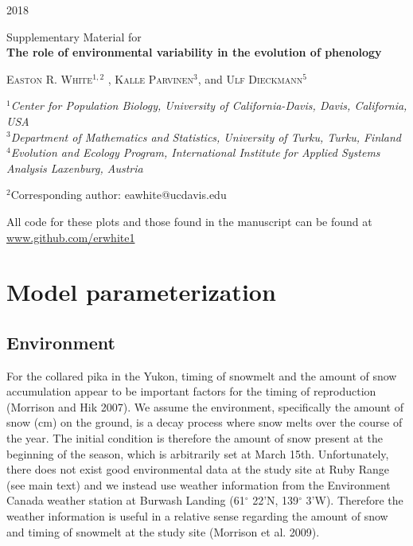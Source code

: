 \documentclass[12pt,]{article}
\title{}
\author{}
\date{}
\begin{document}
2018 \vspace{2cm}

\begin{center}
{\large Supplementary Material for \\ \textbf{The role of environmental variability in the evolution of phenology}} \\

\vspace{1cm}

\textsc{Easton R. White$^{1,2}$ , Kalle Parvinen$^{3}$}, and \textsc{Ulf Dieckmann$^5$} 
        \vspace{2mm}
        
\emph{\small $^1$Center for Population Biology, University of California-Davis, Davis, California, USA \\
            $^3$Department of Mathematics and Statistics, University of Turku, Turku, Finland \\ 
            $^4$Evolution and Ecology Program, International Institute for Applied Systems Analysis Laxenburg, Austria}
        \vspace{0.5mm}
        
$^2$Corresponding author: eawhite@ucdavis.edu
    \vspace{2 mm}
\tableofcontents

\vspace{1cm}
All code for these plots and those found in the manuscript can be found at \hyperref[]{www.github.com/erwhite1}


\end{center}

\pagebreak

\linenumbers

\section{Model parameterization}

\subsection{Environment}

For the collared pika in the Yukon, timing of snowmelt and the amount of
snow accumulation appear to be important factors for the timing of
reproduction (Morrison and Hik 2007). We assume the environment,
specifically the amount of snow (cm) on the ground, is a decay process
where snow melts over the course of the year. The initial condition is
therefore the amount of snow present at the beginning of the season,
which is arbitrarily set at March 15th. Unfortunately, there does not
exist good environmental data at the study site at Ruby Range (see main
text) and we instead use weather information from the Environment Canada
weather station at Burwash Landing (61\(^\circ\) 22'N, 139\(^\circ\)
3'W). Therefore the weather information is useful in a relative sense
regarding the amount of snow and timing of snowmelt at the study site
(Morrison et al. 2009).
\end{document}
